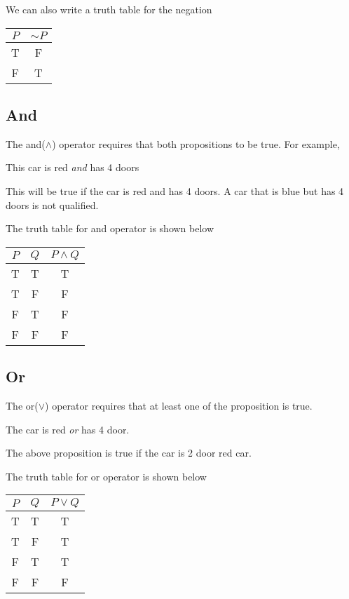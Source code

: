 \documentclass[a4paper, 12pt]{article}
\theoremstyle{examplestyle}
\begin{document}
\begin{multicols}{2}
We can also write a truth table for the negation
\begin{center}
	\begin{tabular}{c|c}
	\hline
	\hline $P$ & $\sim P$  \\ 
	\hline T & F  \\ 
	\hline F & T  \\
	\hline \hline
\end{tabular} 
\end{center}
\subsection*{And}
The and($\land$) operator requires that both propositions to be true. For example,
\begin{center}
	This car is red \emph{and} has 4 doors
\end{center}
This will be true if the car is red and has 4 doors. A car that is blue but has 4 doors is not qualified.

The truth table for and operator is shown below
\begin{center}
	\begin{tabular}{c|c||c}
		\hline\hline $P$ & $Q$ & $P \land Q$ \\ 
		\hline        T  &  T  &      T      \\ 
		\hline        T  &  F  &      F      \\ 
		\hline        F  &  T  &      F      \\ 
		\hline        F  &  F  &      F      \\ 
		\hline\hline 
	\end{tabular} 
\end{center}
\subsection*{Or}
The or($\lor$) operator requires that at least one of the proposition is true.
\begin{center}
	The car is red \emph{or} has 4 door.
\end{center}
The above proposition is true if the car is 2 door red car.

The truth table for or operator is shown below
\begin{center}
	\begin{tabular}{c|c||c}
		\hline\hline $P$ & $Q$ & $P \lor Q$ \\ 
		\hline        T  &  T  &      T      \\ 
		\hline        T  &  F  &      T      \\ 
		\hline        F  &  T  &      T      \\ 
		\hline        F  &  F  &      F      \\ 
		\hline\hline 
	\end{tabular} 
\end{center}

\end{multicols}
\end{document}
